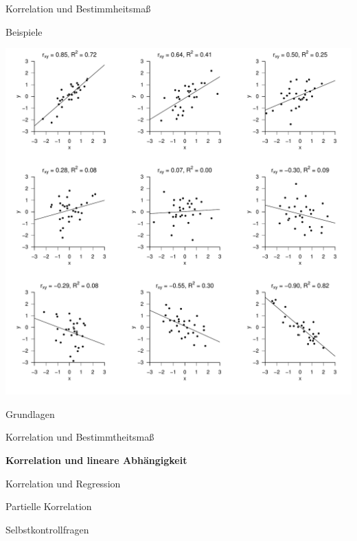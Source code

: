 \documentclass[
  8pt,
  ignorenonframetext,
]{beamer}
\begin{document}
\begin{frame}{Korrelation und Bestimmheitsmaß}
\protect\hypertarget{korrelation-und-bestimmheitsmauxdf-2}{}
\vspace{2mm}

Beispiele

\begin{center}\includegraphics[width=0.6\linewidth]{2_Abbildungen/alm_2_r2beispiele} \end{center}
\end{frame}

\begin{frame}{}
\protect\hypertarget{section-5}{}
\vfill
\large

Grundlagen

Korrelation und Bestimmtheitsmaß

\textbf{Korrelation und lineare Abhängigkeit}

Korrelation und Regression

Partielle Korrelation

Selbstkontrollfragen

\vfill
\end{frame}
\end{document}
